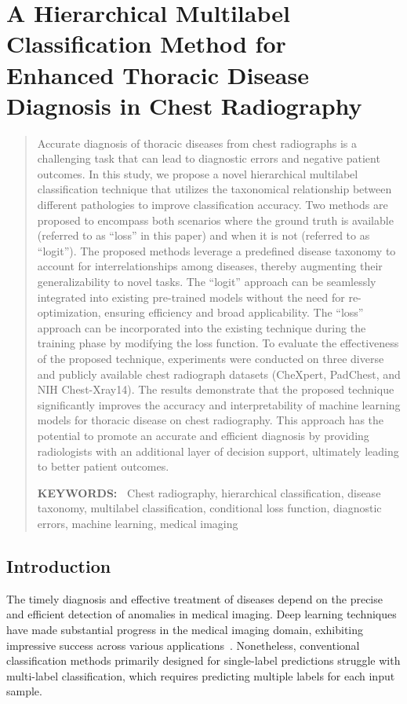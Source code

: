 \chapter{A Hierarchical Multilabel Classification Method for Enhanced Thoracic Disease Diagnosis in Chest Radiography}

\begin{abstract}
Accurate diagnosis of thoracic diseases from chest radiographs is a challenging task that can lead to diagnostic errors and negative patient outcomes. In this study, we propose a novel hierarchical multilabel classification technique that utilizes the taxonomical relationship between different pathologies to improve classification accuracy. Two methods are proposed to encompass both scenarios where the ground truth is available (referred to as ``loss'' in this paper) and when it is not (referred to as ``logit'').  The proposed methods leverage a predefined disease taxonomy to account for interrelationships among diseases, thereby augmenting their generalizability to novel tasks.  The ``logit'' approach can be seamlessly integrated into existing pre-trained models without the need for re-optimization, ensuring efficiency and broad applicability. The ``loss'' approach can be incorporated into the existing technique during the training phase by modifying the loss function.  To evaluate the effectiveness of the proposed technique, experiments were conducted on three diverse and publicly available chest radiograph datasets (CheXpert, PadChest, and NIH Chest-Xray14). The results demonstrate that the proposed technique significantly improves the accuracy and interpretability of machine learning models for thoracic disease on chest radiography. This approach has the potential to promote an accurate and efficient diagnosis by providing radiologists with an additional layer of decision support, ultimately leading to better patient outcomes.

\textbf{KEYWORDS:\ } Chest radiography, hierarchical classification, disease taxonomy, multilabel classification, conditional loss function, diagnostic errors, machine learning, medical imaging
\end{abstract}


\section{Introduction}

The timely diagnosis and effective treatment of diseases depend on the precise and efficient detection of anomalies in medical imaging. Deep learning techniques have made substantial progress in the medical imaging domain, exhibiting impressive success across various applications~\cite{litjens_Survey_2017a}. Nonetheless, conventional classification methods primarily designed for single-label predictions struggle with multi-label classification, which requires predicting multiple labels for each input sample.

